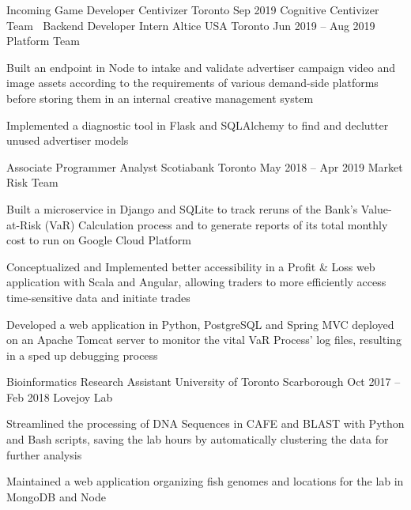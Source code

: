 \begin{cventries}
  \cventry
    {Incoming Game Developer}
    {Centivizer}
    {Toronto}
    {Sep 2019}
    {Cognitive Centivizer Team}
    {
      $\:$
    }
  \cventry
    {Backend Developer Intern}
    {Altice USA}
    {Toronto}
    {Jun 2019 -- Aug 2019}
    {Platform Team}
    {
    \begin{cvitems}
      \item {Built an endpoint in Node to intake and validate advertiser campaign video and image assets according to the requirements of various demand-side platforms before storing them in an internal creative management system}
      \item {Implemented a diagnostic tool in Flask and SQLAlchemy to find and declutter unused advertiser models}
    \end{cvitems}
    }
  \cventry
    {Associate Programmer Analyst}
    {Scotiabank}
    {Toronto}
    {May 2018 -- Apr 2019}
    {Market Risk Team}
    {
      \begin{cvitems}
        \item {Built a microservice in Django and SQLite to track reruns of the Bank's Value-at-Risk (VaR) Calculation process and to generate reports of its total monthly cost to run on Google Cloud Platform}
        \item {Conceptualized and Implemented better accessibility in a Profit \& Loss web application with Scala and Angular, allowing traders to more efficiently access time-sensitive data and initiate trades}
        \item {Developed a web application in Python, PostgreSQL and Spring MVC deployed on an Apache Tomcat server to monitor the vital VaR Process' log files, resulting in a sped up debugging process}
      \end{cvitems}
    }

  \cventry
    {Bioinformatics Research Assistant}
    {University of Toronto}
    {Scarborough}
    {Oct 2017 -- Feb 2018}
    {Lovejoy Lab}
    {
      \begin{cvitems}
        \item {Streamlined the processing of DNA Sequences in CAFE and BLAST with Python and Bash scripts, saving the lab hours by automatically clustering the data for further analysis}
        \item {Maintained a web application organizing fish genomes and locations for the lab in MongoDB and Node}
      \end{cvitems}
    }
\end{cventries}
